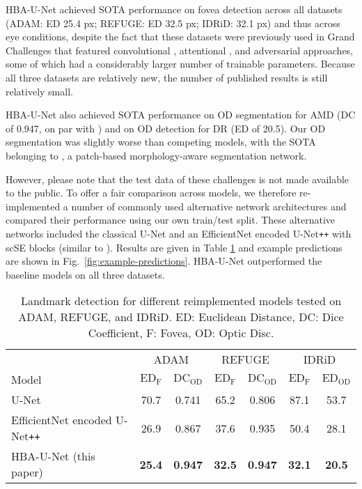 \documentclass[hidelinks,runningheads]{llncs}
\begin{document}
HBA-U-Net achieved \ac{SOTA} performance on fovea detection across all datasets  (ADAM: \ac{ED} 25.4 px; REFUGE: \ac{ED} 32.5 px; IDRiD: 32.1 px) and thus across eye conditions, despite the fact that these datasets were previously used in Grand Challenges that featured convolutional \cite{kamble_optic_2020}, attentional \cite{zhang_et-net_2019}, and adversarial \cite{wang_patch-based_2019} approaches, some of which had a considerably larger number of trainable parameters.
Because all three datasets are relatively new, the number of published results is still relatively small.


HBA-U-Net also achieved \ac{SOTA} performance on \ac{OD} segmentation for \ac{AMD} (\ac{DC} of 0.947, on par with \cite{kamble_optic_2020}) and on \ac{OD} detection for \ac{DR} (\ac{ED} of 20.5).
Our \ac{OD} segmentation was slightly worse than competing models, with the \ac{SOTA} belonging to \cite{wang_patch-based_2019}, a patch-based morphology-aware segmentation network.







However, please note that the test data of these challenges is not made available to the public.
To offer a fair comparison across models, we therefore re-implemented a number of commonly used alternative network architectures and compared their performance using our own train/test split. These alternative networks included the classical U-Net \cite{ronneberger_u-net_2015} and an EfficientNet \cite{tan_efficientnet_2020} encoded U-Net\verb!++! with scSE blocks (similar to \cite{kamble_optic_2020}). Results are given in Table \ref{tab:reimplemented_models} and example predictions are shown in Fig.~\ref{fig:example-predictions}. HBA-U-Net outperformed the baseline models on all three datasets.





\begin{table}[t!]
    \caption{Landmark detection for different reimplemented models tested on ADAM, REFUGE, and IDRiD.
ED: Euclidean Distance, DC: Dice Coefficient, F: Fovea, OD: Optic Disc.}
    \centering
    \setlength\tabcolsep{4pt}
    \def\arraystretch{1.2}\begin{tabularx}{\textwidth}{X|cc|cc|cc}
    &  \multicolumn{2}{c|}{ADAM} & \multicolumn{2}{c|}{REFUGE} & \multicolumn{2}{c}{IDRiD} \\
    Model &  $\mathrm{ED}_\mathrm{F}$ & $\mathrm{DC}_\mathrm{OD}$ & $\mathrm{ED}_\mathrm{F}$ & $\mathrm{DC}_\mathrm{OD}$ & $\mathrm{ED}_\mathrm{F}$ & $\mathrm{ED}_\mathrm{OD}$ \\ \hline
    U-Net \cite{ronneberger_u-net_2015}  & 70.7 & 0.741 &  65.2 &  0.806&  87.1&   53.7\\
    EfficientNet encoded U-Net\texttt{++} \cite{kamble_optic_2020}
    & 26.9 & 0.867 &  37.6&  0.935&  50.4&  28.1\\
    HBA-U-Net (this paper) & {\bf 25.4} & {\bf 0.947}  &  {\bf 32.5}& {\bf 0.947}& {\bf 32.1}& {\bf 20.5} 
    \end{tabularx}
    \label{tab:reimplemented_models}
\end{table}
\end{document}
